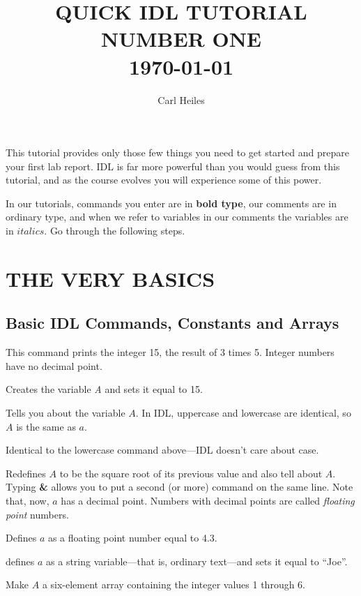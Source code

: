\documentclass[psfig,preprint]{aastex}
\begin{document}
\title{\bf QUICK IDL TUTORIAL NUMBER ONE \\ \today}

\author{Carl Heiles}

\tableofcontents


	This tutorial provides only those few things you need to get
started and prepare your first lab report. IDL is far more powerful than
you would guess from this tutorial, and as the course evolves you will
experience some of this power.

	In our tutorials, commands you enter are in {\bf bold type}, our
comments are in ordinary type, and when we refer to variables in our
comments the variables are in $italics$.  Go through the following
steps. 

\section {THE VERY BASICS}

\subsection{Basic IDL Commands, Constants and Arrays}

 This command prints the integer 15, the
result of 3 times 5.  Integer numbers have no decimal point. 

 Creates the variable {\it A} and sets it equal
to 15. 

 Tells you about the variable $A$.  In IDL,
uppercase and lowercase are identical, so $A$ is the same as $a$. 

 Identical to the lowercase command above---IDL
doesn't care about case. 

 Redefines $A$ to be the square
root of its previous value and also tell about $A$.  Typing {\bf \&}
allows you to put a second (or more) command on the same line.  Note
that, now, $a$ has a decimal point.  Numbers with decimal points are
called {\it floating point} numbers. 

 Defines $a$ as a floating point number equal to
4.3. 

 defines $a$ as a string variable---that is,
ordinary text---and sets it equal to ``Joe''.

 Make $A$ a six-element array
containing the integer values 1 through 6. 
\end{document}
